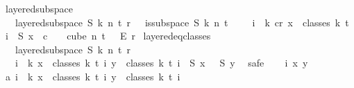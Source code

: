 \begin{isabellebody}
%
\endisadelimproof
\isanewline
\isanewline
{}\isamarkupfalse%
\ layered{\isacharunderscore}{\kern0pt}subspace\isanewline
\ \ \ {\isachardoublequoteopen}layered{\isacharunderscore}{\kern0pt}subspace\ S\ k\ n\ t\ r\ {\isasymchi}\ {\isasymequiv}\ {\isacharparenleft}{\kern0pt}is{\isacharunderscore}{\kern0pt}subspace\ S\ k\ n\ {\isacharparenleft}{\kern0pt}t\ {\isacharplus}{\kern0pt}\ {}{\isacharparenright}{\kern0pt}\ \ {\isasymand}\ {\isacharparenleft}{\kern0pt}{\isasymforall}i\ {\isasymin}\ {\isacharbraceleft}{\kern0pt}{\isachardot}{\kern0pt}{\isachardot}{\kern0pt}k{\isacharbraceright}{\kern0pt}{\isachardot}{\kern0pt}\ {\isasymexists}c{\isacharless}{\kern0pt}r{\isachardot}{\kern0pt}\ {\isasymforall}x\ {\isasymin}\ classes\ k\ t\ i{\isachardot}{\kern0pt}\ {\isasymchi}\ {\isacharparenleft}{\kern0pt}S\ x{\isacharparenright}{\kern0pt}\ {\isacharequal}{\kern0pt}\ c{\isacharparenright}{\kern0pt}{\isacharparenright}{\kern0pt}\ {\isasymand}\ {\isasymchi}\ {\isasymin}\ cube\ n\ {\isacharparenleft}{\kern0pt}t\ {\isacharplus}{\kern0pt}\ {}{\isacharparenright}{\kern0pt}\ {\isasymrightarrow}\isactrlsub E\ {\isacharbraceleft}{\kern0pt}{\isachardot}{\kern0pt}{\isachardot}{\kern0pt}{\isacharless}{\kern0pt}r{\isacharbraceright}{\kern0pt}{\isachardoublequoteclose}\isanewline
\isanewline
{}\isamarkupfalse%
\ layered{\isacharunderscore}{\kern0pt}eq{\isacharunderscore}{\kern0pt}classes{\isacharcolon}{\kern0pt}\ \isanewline
\ \ \ {\isachardoublequoteopen}layered{\isacharunderscore}{\kern0pt}subspace\ S\ k\ n\ t\ r\ {\isasymchi}{\isachardoublequoteclose}\ \isanewline
\ \ \ {\isachardoublequoteopen}{\isasymforall}i\ {\isasymin}\ {\isacharbraceleft}{\kern0pt}{\isachardot}{\kern0pt}{\isachardot}{\kern0pt}k{\isacharbraceright}{\kern0pt}{\isachardot}{\kern0pt}\ {\isasymforall}x\ {\isasymin}\ classes\ k\ t\ i{\isachardot}{\kern0pt}\ {\isasymforall}y\ {\isasymin}\ classes\ k\ t\ i{\isachardot}{\kern0pt}\ {\isasymchi}\ {\isacharparenleft}{\kern0pt}S\ x{\isacharparenright}{\kern0pt}\ {\isacharequal}{\kern0pt}\ {\isasymchi}\ {\isacharparenleft}{\kern0pt}S\ y{\isacharparenright}{\kern0pt}{\isachardoublequoteclose}\ \isanewline
%
\isadelimproof
%
\endisadelimproof
%
\isatagproof
{}\isamarkupfalse%
\ {\isacharparenleft}{\kern0pt}safe{\isacharparenright}{\kern0pt}\isanewline
\ \ \isamarkupfalse%
\ i\ x\ y\isanewline
\ \ \isamarkupfalse%
\ a{\isacharcolon}{\kern0pt}\ {\isachardoublequoteopen}i\ {\isasymle}\ k{\isachardoublequoteclose}\ {\isachardoublequoteopen}x\ {\isasymin}\ classes\ k\ t\ i{\isachardoublequoteclose}\ {\isachardoublequoteopen}y\ {\isasymin}\ classes\ k\ t\ i{\isachardoublequoteclose}\isanewline

\end{isabellebody}
